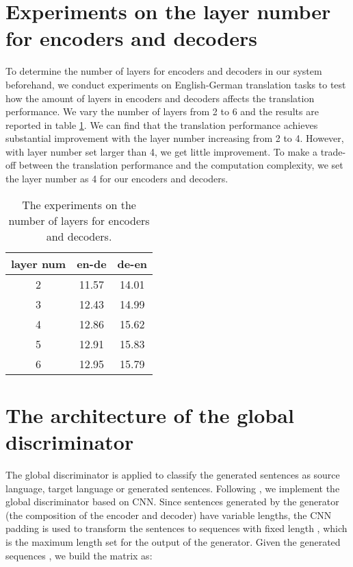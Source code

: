 \documentclass[11pt,a4paper]{article}
\begin{document}
\section{Experiments on the layer number for encoders and decoders}
\label{sec:appendix for layernum}
To determine the number of layers for encoders and decoders in our system beforehand, we conduct experiments on English-German translation tasks to test how the amount of layers in encoders and decoders affects the translation performance. We vary the number of layers from 2 to 6 and the results are reported in table \ref{tab:layer num}. We can find that the translation performance achieves substantial improvement with the layer number increasing from 2 to 4. However, with layer number set larger than 4, we get little improvement. To make a trade-off between the translation performance and the computation complexity, we set the layer number as 4 for our encoders and decoders.
\begin{table}[htb]
			\centering
				\begin{tabular}{c|cc}
					\toprule[2pt]
					layer num & en-de	& de-en	 \\
					\midrule[1pt]
                    2  &   11.57    &   14.01      \\
					3  &   12.43    &   14.99      \\
                    4  &   12.86    &   15.62      \\
                    5  &   12.91    &   15.83      \\
                    6  &   12.95    &   15.79      \\
					\bottomrule[2pt]
				\end{tabular}
				\caption{\label{tab:layer num} The experiments on the number of layers for encoders and decoders.}
\end{table}

\section{The architecture of the global discriminator}
\label{sec:appendix for arc of discriminator}
The global discriminator is applied to classify the generated sentences as source language, target language or generated sentences. Following \cite{Yang2017Improving}, we implement the global discriminator based on CNN. Since sentences generated by the generator (the composition of the encoder and decoder) have variable lengths, the CNN padding is used to transform the sentences to sequences with fixed length , which is the maximum length set for the output of the generator. Given the generated sequences , we build the matrix  as:
\end{document}

